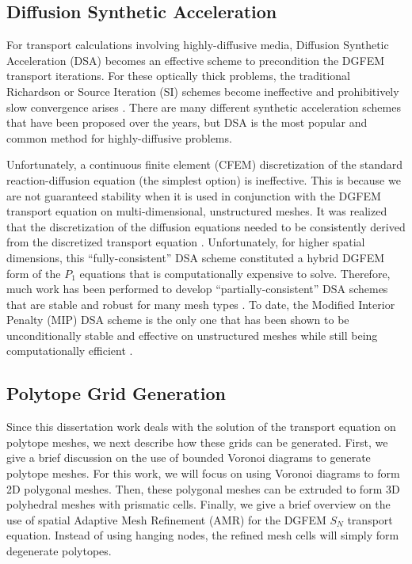 \subsection{Diffusion Synthetic Acceleration}
\label{sec::Intro_Past_DSA}

For transport calculations involving highly-diffusive media, Diffusion Synthetic Acceleration (DSA) becomes an effective scheme to precondition the DGFEM transport iterations. For these optically thick problems, the traditional Richardson or Source Iteration (SI) schemes become ineffective and prohibitively slow convergence arises \cite{ref::adams_larsen_iter_methods}. There are many different synthetic acceleration schemes that have been proposed over the years, but DSA is the most popular and common method for highly-diffusive problems.

Unfortunately, a continuous finite element (CFEM) discretization of the standard reaction-diffusion equation (the simplest option) is ineffective. This is because we are not guaranteed stability when it is used in conjunction with the DGFEM transport equation on multi-dimensional, unstructured meshes. It was realized that the discretization of the diffusion equations needed to be consistently derived from the discretized transport equation \cite{alcouffe1976stable,alcouffe1977DSA,larsen1982unconditionally_I,larsen1982unconditionally_II,warsa2002fully}. Unfortunately, for higher spatial dimensions, this ``fully-consistent'' DSA scheme constituted a hybrid DGFEM form of the $P_1$ equations that is computationally expensive to solve. Therefore, much work has been performed to develop ``partially-consistent'' DSA schemes that are stable and robust for many mesh types \cite{ref::dsa_DFEM_adams_martin,wareing1991diffusion,ref::DSA_wang_ragusa}. To date, the Modified Interior Penalty (MIP) DSA scheme is the only one that has been shown to be unconditionally stable and effective on unstructured meshes while still being computationally efficient \cite{ref::DSA_wang_ragusa,turcksin2014discontinuous}.

\subsection{Polytope Grid Generation}
\label{sec::Intro_Past_Polytopes}

Since this dissertation work deals with the solution of the transport equation on polytope meshes, we next describe how these grids can be generated. First, we give a brief discussion on the use of bounded Voronoi diagrams to generate polytope meshes. For this work, we will focus on using Voronoi diagrams to form 2D polygonal meshes. Then, these polygonal meshes can be extruded to form 3D polyhedral meshes with prismatic cells. Finally, we give a brief overview on the use of spatial Adaptive Mesh Refinement (AMR) for the DGFEM $S_N$ transport equation. Instead of using hanging nodes, the refined mesh cells will simply form degenerate polytopes.

